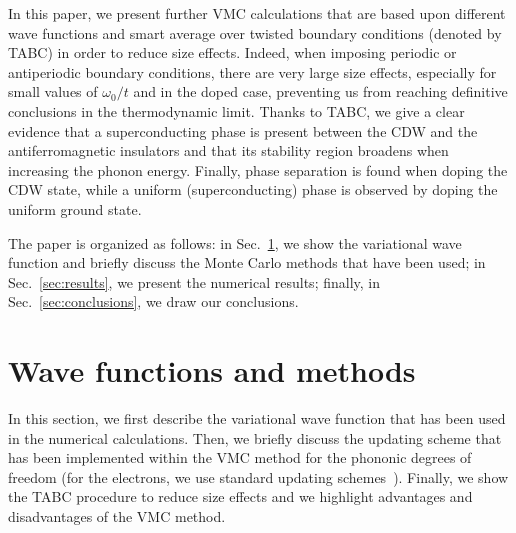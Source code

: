 \documentclass[aps,superscriptaddress,amsmath,amssymb,twocolumn,showpacs,floatfix,english]{revtex4}
\begin{document}
In this paper, we present further VMC calculations that are based upon different wave functions and smart average over twisted boundary
conditions (denoted by TABC) in order to reduce size effects. Indeed, when imposing periodic or antiperiodic boundary conditions, there are 
very large size effects, especially for small values of $\omega_0/t$ and in the doped case, preventing us from reaching definitive conclusions 
in the thermodynamic limit. Thanks to TABC, we give a clear evidence that a superconducting phase is present between the CDW and the 
antiferromagnetic insulators and that its stability region broadens when increasing the phonon energy. Finally, phase separation is found 
when doping the CDW state, while a uniform (superconducting) phase is observed by doping the uniform ground state. 

The paper is organized as follows: in Sec.~\ref{sec:methods}, we show the variational wave function and briefly discuss the Monte Carlo
methods that have been used; in Sec.~\ref{sec:results}, we present the numerical results; finally, in Sec.~\ref{sec:conclusions}, we 
draw our conclusions.

\section{Wave functions and methods}\label{sec:methods}

In this section, we first describe the variational wave function that has been used in the numerical calculations. Then, we briefly 
discuss the updating scheme that has been implemented within the VMC method for the phononic degrees of freedom (for the electrons, we
use standard updating schemes~\cite{BeccaBook}). Finally, we show the TABC procedure to reduce size effects and we highlight 
advantages and disadvantages of the VMC method.
\end{document}
